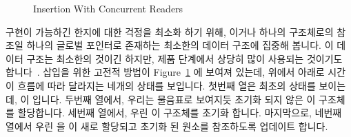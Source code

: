 \begin{figure}[tb]
\centering
{}
\caption{Insertion With Concurrent Readers}
\label{fig:defer:Insertion With Concurrent Readers}
\end{figure}

구현이 가능하긴 한지에 대한 걱정을 최소화 하기 위해,  이거나 하나의
구조체로의 참조일 하나의 글로벌 포인터로 존재하는 최소한의 데이터 구조에 집중해
봅니다.
이 데이터 구조는 최소한의 것이긴 하지만, 제품 단계에서 상당히 많이 사용되는
것이기도 합니다~\cite{GeoffRomer2018C++DeferredReclamationP0561R4}.
삽입을 위한 고전적 방법이
Figure~\ref{fig:defer:Insertion With Concurrent Readers}
에 보여져 있는데, 위에서 아래로 시간이 흐름에 따라 달라지는 네개의 상태를
보입니다.
첫번째 열은 최초의 상태를 보이는데,  이  입니다.
두번째 열에서, 우리는 물음표로 보여지듯 초기화 되지 않은 이 구조체를
할당합니다.
세번째 열에서, 우린 이 구조체를 초기화 합니다.
마지막으로, 네번째 열에서 우린  을 이 새로 할당되고 초기화 된 원소를
참조하도록 업데이트 합니다.

